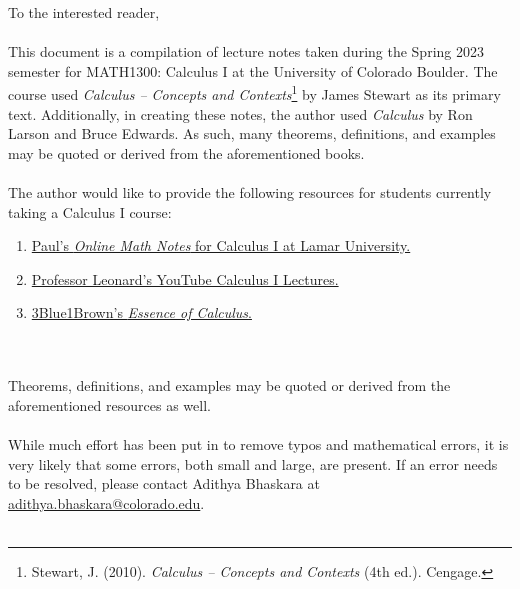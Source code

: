 To the interested reader,
\\
\\
This document is a compilation of lecture notes taken during the Spring 2023 semester for MATH1300: Calculus I at the University of Colorado Boulder. The course used \textit{Calculus -- Concepts and Contexts}\footnote{Stewart, J. (2010). \textit{Calculus -- Concepts and Contexts} (4th ed.). Cengage.} by James Stewart as its primary text. Additionally, in creating these notes, the author used \textit{Calculus} by Ron Larson and Bruce Edwards. As such, many theorems, definitions, and examples may be quoted or derived from the aforementioned books.
\\
\\
The author would like to provide the following resources for students currently taking a Calculus I course:
\begin{enumerate}
    \item \href{https://tutorial.math.lamar.edu/classes/calci/calci.aspx}{Paul's \textit{Online Math Notes} for Calculus I at Lamar University.}
    \item \href{https://youtube.com/playlist?list=PLF797E961509B4EB5}{Professor Leonard's YouTube Calculus I Lectures.}
    \item \href{https://www.youtube.com/watch?v=WUvTyaaNkzM&list=PLZHQObOWTQDMsr9K-rj53DwVRMYO3t5Yr}{3Blue1Brown's \textit{Essence of Calculus}.}
\end{enumerate}
\vphantom
\\
\\
Theorems, definitions, and examples may be quoted or derived from the aforementioned resources as well.
\\
\\
While much effort has been put in to remove typos and mathematical errors, it is very likely that some errors, both small and large, are present. If an error needs to be resolved, please contact Adithya Bhaskara at \href{mailto:adithya.bhaskara@colorado.edu}{adithya.bhaskara@colorado.edu}.
\\
\\
\vfill
{}